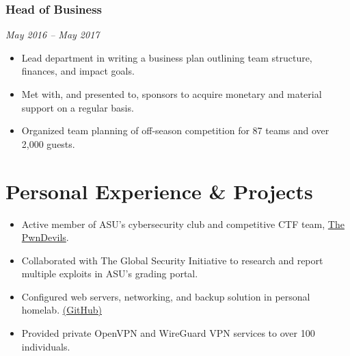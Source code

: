 \documentclass{article}
\begin{document}
\subsubsection{Head of Business}
\textit{May 2016 – May 2017}
\begin{itemize}[leftmargin=*]
\item Lead department in writing a business plan outlining team structure, finances, and impact goals.
\item Met with, and presented to, sponsors to acquire monetary and material support on a regular basis.
\item Organized team planning of off-season competition for 87 teams and over 2,000 guests.
\end{itemize}

\section{Personal Experience \& Projects}
\begin{itemize}[leftmargin=*]
\item Active member of ASU’s cybersecurity club and competitive CTF team, \href{https://pwndevils.com/}{The PwnDevils}.
\item Collaborated with The Global Security Initiative to research and report multiple exploits in ASU's grading portal.
\item Configured web servers, networking, and backup solution in personal homelab. \href{https://github.com/ColeGreenlee/GreenleeNet}{(GitHub)}
\item Provided private OpenVPN and WireGuard VPN services to over 100 individuals.
\end{itemize}
\end{document}
